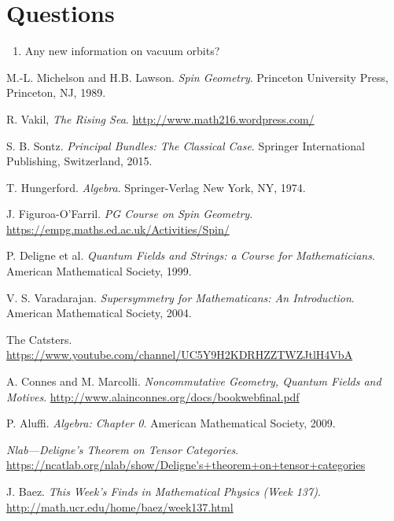 \documentclass[a4paper,10pt]{scrreprt}
\theoremstyle{definition}
\theoremstyle{plain}
\theoremstyle{remark}
\begin{document}
\chapter{Questions}
\begin{enumerate}
  \item Any new information on vacuum orbits? 
\end{enumerate}
\begin{thebibliography}{9}
   M.-L. Michelson and H.B. Lawson.
    \textit{Spin Geometry}.
    Princeton University Press, Princeton, NJ, 1989.

   R. Vakil,
    \textit{The Rising Sea}.
    \url{http://www.math216.wordpress.com/}

   S. B. Sontz.
    \textit{Principal Bundles: The Classical Case}.
    Springer International Publishing, Switzerland, 2015.

   T. Hungerford.
    \textit{Algebra}.
    Springer-Verlag New York, NY, 1974.

   J. Figuroa-O'Farril. 
    \textit{PG Course on Spin Geometry}.
    \url{https://empg.maths.ed.ac.uk/Activities/Spin/}

   P. Deligne et al.
    \textit{Quantum Fields and Strings: a Course for Mathematicians}.
    American Mathematical Society, 1999.

   V. S. Varadarajan.
    \textit{Supersymmetry for Mathematicans: An Introduction}.
    American Mathematical Society, 2004.

   The Catsters.
    \url{https://www.youtube.com/channel/UC5Y9H2KDRHZZTWZJtlH4VbA}

   A. Connes and M. Marcolli.
    \textit{Noncommutative Geometry, Quantum Fields and Motives}.
    \url{http://www.alainconnes.org/docs/bookwebfinal.pdf}

   P. Aluffi.
    \textit{Algebra: Chapter 0}.
    American Mathematical Society, 2009.

    \textit{Nlab---Deligne's Theorem on Tensor Categories}.
    \url{https://ncatlab.org/nlab/show/Deligne's+theorem+on+tensor+categories}

   J. Baez.
    \textit{This Week's Finds in Mathematical Physics (Week 137)}.
    \url{http://math.ucr.edu/home/baez/week137.html}


\end{thebibliography}
\end{document}
